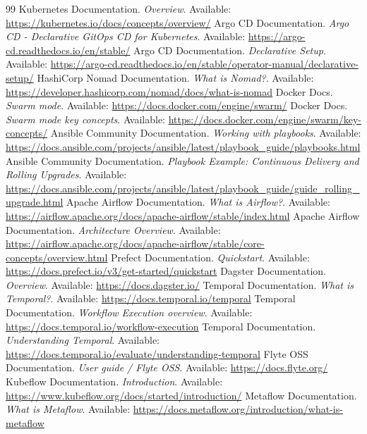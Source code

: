 \documentclass[11pt]{article}
\begin{document}
\begin{thebibliography}{99}
 Kubernetes Documentation. \emph{Overview}. Available: \url{https://kubernetes.io/docs/concepts/overview/}
 Argo CD Documentation. \emph{Argo CD - Declarative GitOps CD for Kubernetes}. Available: \url{https://argo-cd.readthedocs.io/en/stable/}
 Argo CD Documentation. \emph{Declarative Setup}. Available: \url{https://argo-cd.readthedocs.io/en/stable/operator-manual/declarative-setup/}
 HashiCorp Nomad Documentation. \emph{What is Nomad?}. Available: \url{https://developer.hashicorp.com/nomad/docs/what-is-nomad}
 Docker Docs. \emph{Swarm mode}. Available: \url{https://docs.docker.com/engine/swarm/}
 Docker Docs. \emph{Swarm mode key concepts}. Available: \url{https://docs.docker.com/engine/swarm/key-concepts/}
 Ansible Community Documentation. \emph{Working with playbooks}. Available: \url{https://docs.ansible.com/projects/ansible/latest/playbook_guide/playbooks.html}
 Ansible Community Documentation. \emph{Playbook Example: Continuous Delivery and Rolling Upgrades}. Available: \url{https://docs.ansible.com/projects/ansible/latest/playbook_guide/guide_rolling_upgrade.html}
 Apache Airflow Documentation. \emph{What is Airflow?}. Available: \url{https://airflow.apache.org/docs/apache-airflow/stable/index.html}
 Apache Airflow Documentation. \emph{Architecture Overview}. Available: \url{https://airflow.apache.org/docs/apache-airflow/stable/core-concepts/overview.html}
 Prefect Documentation. \emph{Quickstart}. Available: \url{https://docs.prefect.io/v3/get-started/quickstart}
 Dagster Documentation. \emph{Overview}. Available: \url{https://docs.dagster.io/}
 Temporal Documentation. \emph{What is Temporal?}. Available: \url{https://docs.temporal.io/temporal}
 Temporal Documentation. \emph{Workflow Execution overview}. Available: \url{https://docs.temporal.io/workflow-execution}
 Temporal Documentation. \emph{Understanding Temporal}. Available: \url{https://docs.temporal.io/evaluate/understanding-temporal}
 Flyte OSS Documentation. \emph{User guide / Flyte OSS}. Available: \url{https://docs.flyte.org/}
 Kubeflow Documentation. \emph{Introduction}. Available: \url{https://www.kubeflow.org/docs/started/introduction/}
 Metaflow Documentation. \emph{What is Metaflow}. Available: \url{https://docs.metaflow.org/introduction/what-is-metaflow}
\end{thebibliography}
\end{document}
